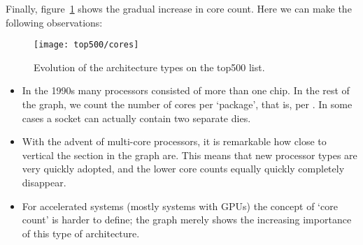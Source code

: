 Finally, figure~\ref{fig:top500-cores} shows the gradual increase in
core count. Here we can make the following observations:
\begin{figure}[ht]
  \texttt{[image: top500/cores]}
  \caption{Evolution of the architecture types on the top500 list.}
  \label{fig:top500-cores}
\end{figure}
\begin{itemize}
\item In the 1990s many processors consisted of more than one chip.
  In the rest of the graph, we count the number of cores per
  `package', that is, per . In some cases a socket
  can actually contain two separate dies.
\item With the advent of multi-core processors, it is remarkable how
  close to vertical the section in the graph are. This means that new
  processor types are very quickly adopted, and the lower core counts
  equally quickly completely disappear.
\item For accelerated systems (mostly systems with \acp{GPU}) the
  concept of `core count' is harder to define; the graph merely shows
  the increasing importance of this type of architecture.
\end{itemize}

